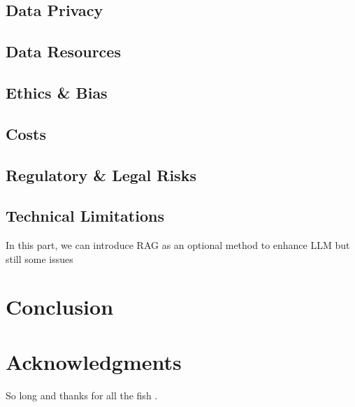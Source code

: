 \documentclass[fleqn,10pt]{SelfArx} %
\begin{document}
\subsection{Data Privacy}
\subsection{Data Resources}
\subsection{Ethics \& Bias}
\subsection{Costs}
\subsection{Regulatory \& Legal Risks}
\subsection{Technical Limitations}
In this part, we can introduce RAG as an optional method to enhance LLM but still some issues
\section{Conclusion}

\lipsum[15-23] %


\section*{Acknowledgments} %


So long and thanks for all the fish \cite{Figueredo:2009dg, Smith:2012qr}.





\end{document}
